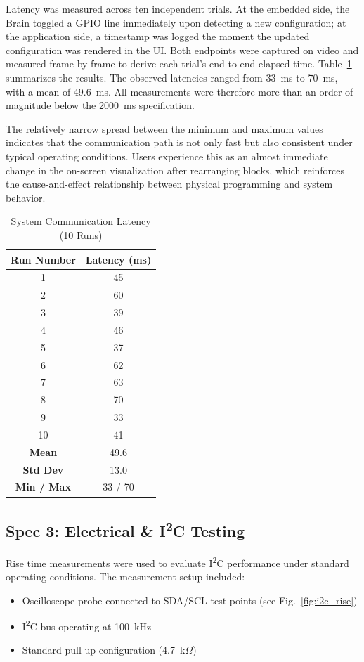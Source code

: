 \documentclass[10pt, conference]{IEEEtran}
\begin{document}
Latency was measured across ten independent trials. At the embedded side, the Brain toggled a GPIO line immediately upon detecting a new configuration; at the application side, a timestamp was logged the moment the updated configuration was rendered in the UI. Both endpoints were captured on video and measured frame-by-frame to derive each trial's end-to-end elapsed time. Table~\ref{tab:COM_latency} summarizes the results. The observed latencies ranged from 33~ms to 70~ms, with a mean of 49.6~ms. All measurements were therefore more than an order of magnitude below the 2000~ms specification.

The relatively narrow spread between the minimum and maximum values indicates that the communication path is not only fast but also consistent under typical operating conditions. Users experience this as an almost immediate change in the on-screen visualization after rearranging blocks, which reinforces the cause-and-effect relationship between physical programming and system behavior.

\begin{table}[htbp]
\renewcommand{\arraystretch}{1.3}
\caption{System Communication Latency (10 Runs)}
\label{tab:COM_latency}
\centering
\begin{tabular}{c c}
\toprule
\textbf{Run Number} & \textbf{Latency (ms)} \\
\midrule
1 & 45 \\
2 & 60 \\
3 & 39 \\
4 & 46 \\
5 & 37 \\
6 & 62 \\
7 & 63 \\
8 & 70 \\
9 & 33 \\
10 & 41 \\
\midrule
\textbf{Mean} & 49.6 \\
\textbf{Std Dev} & 13.0 \\
\textbf{Min / Max} & 33 / 70 \\
\bottomrule
\end{tabular}
\end{table}

\subsection{Spec 3: Electrical \& I\textsuperscript{2}C Testing}

Rise time measurements were used to evaluate I\textsuperscript{2}C performance under standard operating conditions. The measurement setup included:
\begin{itemize}
\item Oscilloscope probe connected to SDA/SCL test points (see Fig.~\ref{fig:i2c_rise})
\item I\textsuperscript{2}C bus operating at 100~kHz
\item Standard pull-up configuration (4.7~k$\Omega$)
\end{itemize}
\end{document}
